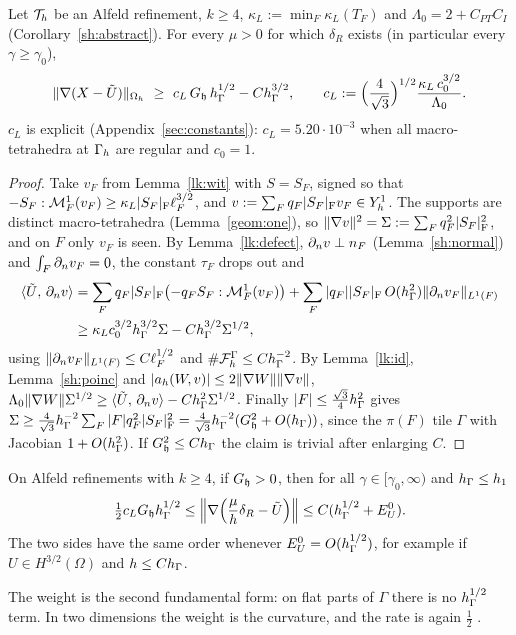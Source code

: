 \begin{theorem}\label{lk:low}
Let $\mathcal T_h$ be an Alfeld refinement, $k\ge4$, $\kappa_L:=\min_F\kappa_L(T_F)$ and $\Lambda_0=2+C_{PT}C_I$ (Corollary~\ref{sh:abstract}). For every $\mu>0$ for which $\delta_R$ exists (in particular every $\gamma\ge\gamma_0$),
\[
\norm{\nabla(X-\Ut)}_{\Oh}\ \ge\ c_L\,G_\hh\,\hG^{1/2}-C\hG^{3/2},\qquad c_L:=\Bigl(\frac{4}{\sqrt3}\Bigr)^{1/2}\frac{\kappa_L\,c_0^{3/2}}{\Lambda_0}.
\]
$c_L$ is explicit (Appendix~\ref{sec:constants}): $c_L=5.20\cdot10^{-3}$ when all macro-tetrahedra at $\Gamma_h$ are regular and $c_0=1$. 
\end{theorem}
\begin{proof}
Take $v_F$ from Lemma~\ref{lk:wit} with $S=S_F$, signed so that $-S_F:\mathcal M^1_F(v_F)\ge\kappa_L|S_F|_{\rm F}\ell_F^{3/2}$, and $v:=\sum_Fq_F|S_F|_{\rm F}v_F\in Y_h^1$. The supports are distinct macro-tetrahedra (Lemma~\ref{geom:one}), so $\lVert \nabla v\rVert^2=\Sigma:=\sum_Fq_F^2|S_F|^2_{\rm F}$, and on $F$ only $v_F$ is seen. By Lemma~\ref{lk:defect}, $\partial_n v\perp n_F$ (Lemma~\ref{sh:normal}) and $\int_F\partial_n v_F=0$, the constant $\tau_F$ drops out and
\begin{align*}
\langle \tilde U,\, \partial_n v\rangle&=\sum_Fq_F|S_F|_{\rm F}\bigl(-q_FS_F:\mathcal M^1_F(v_F)\bigr)+\sum_F|q_F||S_F|_{\rm F}\,O(h_\Gamma^2)\lVert \partial_n v_F\rVert_{L^1(F)}\\
&\ge\kappa_Lc_0^{3/2}h_\Gamma^{3/2}\Sigma-Ch_\Gamma^{3/2}\Sigma^{1/2},
\end{align*}
using $\lVert \partial_n v_F\rVert_{L^1(F)}\le C\ell_F^{1/2}$ and $\#\mathcal F_h^\Gamma\le Ch_\Gamma^{-2}$. By Lemma~\ref{lk:id}, Lemma~\ref{sh:poinc} and $|a_h(W,v)|\le2\lVert \nabla W\rVert\lVert \nabla v\rVert$, $\Lambda_0\lVert \nabla W\rVert\Sigma^{1/2}\ge\langle \tilde U,\, \partial_n v\rangle-Ch_\Gamma^2\Sigma^{1/2}$. Finally $|F|\le\frac{\sqrt3}4h_\Gamma^2$ gives $\Sigma\ge\frac4{\sqrt3}h_\Gamma^{-2}\sum_F|F|q_F^2|S_F|^2_{\rm F}=\frac4{\sqrt3}h_\Gamma^{-2}(G_\mathfrak h^2+O(h_\Gamma))$, since the $\pi(F)$ tile $\Gamma$ with Jacobian $1+O(h_\Gamma^2)$. If $G_\mathfrak h^2\le Ch_\Gamma$ the claim is trivial after enlarging $C$.
\end{proof}

\begin{corollary}\label{lk:two}
On Alfeld refinements with $k\ge4$, if $G_\mathfrak h>0$, then for all $\gamma\in[\gamma_0,\infty)$ and $h_\Gamma\le h_1$
\[
\tfrac12c_LG_\mathfrak hh_\Gamma^{1/2}\le\Bigl\|\nabla\Bigl(\frac\mu h\delta_R-\tilde U\Bigr)\Bigr\|\le C(h_\Gamma^{1/2}+E^0_U).
\]
The two sides have the same order whenever $E^0_U=O(h_\Gamma^{1/2})$, for example if $U\in H^{3/2}(\Omega)$ and $h\le Ch_\Gamma$.
\end{corollary}
The weight is the second fundamental form: on flat parts of $\Gamma$ there is no $h_\Gamma^{1/2}$ term. In two dimensions the weight is the curvature, and the rate is again $\frac12$ \cite{PadhiLong2D}.

